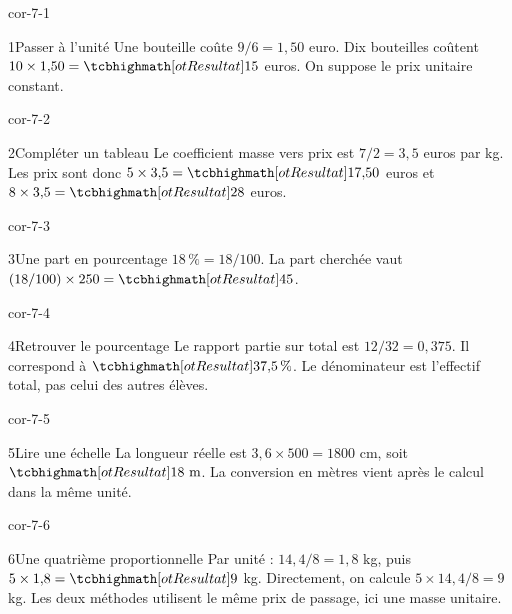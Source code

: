 \clearpage\pagestyle{otMain}\setlength{\otBlocEspacement}{2.5mm}\fontsize{11}{15}\selectfont{}
\begin{blocLivre}{cor-7-1}\begin{corrige}{1}{Passer à l’unité}
Une bouteille coûte $9/6=1{,}50$ euro. Dix bouteilles coûtent $10\times1{,}50=\res{15}$ euros. On suppose le prix unitaire constant.
\end{corrige}\end{blocLivre}
\begin{blocLivre}{cor-7-2}\begin{corrige}{2}{Compléter un tableau}
Le coefficient masse vers prix est $7/2=3{,}5$ euros par kg. Les prix sont donc $5\times3{,}5=\res{17{,}50}$ euros et $8\times3{,}5=\res{28}$ euros.
\end{corrige}\end{blocLivre}
\begin{blocLivre}{cor-7-3}\begin{corrige}{3}{Une part en pourcentage}
$18\,\%=18/100$. La part cherchée vaut $(18/100)\times250=\res{45}$.
\end{corrige}\end{blocLivre}
\begin{blocLivre}{cor-7-4}\begin{corrige}{4}{Retrouver le pourcentage}
Le rapport partie sur total est $12/32=0{,}375$. Il correspond à $\res{37{,}5\,\%}$. Le dénominateur est l’effectif total, pas celui des autres élèves.
\end{corrige}\end{blocLivre}
\begin{blocLivre}{cor-7-5}\begin{corrige}{5}{Lire une échelle}
La longueur réelle est $3{,}6\times500=1800$ cm, soit $\res{18\ \mathrm m}$. La conversion en mètres vient après le calcul dans la même unité.
\end{corrige}\end{blocLivre}
\begin{blocLivre}{cor-7-6}\begin{corrige}{6}{Une quatrième proportionnelle}
Par unité : $14{,}4/8=1{,}8$ kg, puis $5\times1{,}8=\res9$ kg. Directement, on calcule $5\times14{,}4/8=9$ kg. Les deux méthodes utilisent le même prix de passage, ici une masse unitaire.
\end{corrige}\end{blocLivre}
